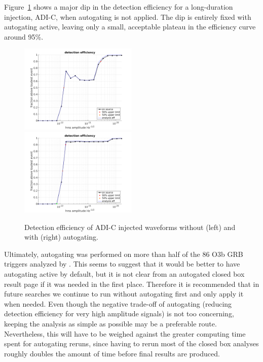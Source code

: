 Figure~\ref{fig:eff-before-after} shows a major dip in the detection efficiency for a long-duration injection, ADI-C, when autogating is not applied.
The dip is entirely fixed with autogating active, leaving only a small, acceptable plateau in the efficiency curve around 95\%.

\begin{figure}[htb]
	\includegraphics[trim={1.1cm 0 1.6cm 0}, clip, width=0.5\textwidth]{figures/grb/eff-before.png}
		\includegraphics[trim={1.1cm 0 1.6cm 0}, clip, width=0.5\textwidth]{figures/grb/eff-after.png}
	\caption{Detection efficiency of ADI-C injected waveforms without (left) and with (right) autogating.}
	\label{fig:eff-before-after}
\end{figure}



Ultimately, autogating was performed on more than half of the 86 O3b GRB triggers analyzed by \xpip.
This seems to suggest that it would be better to have autogating active by default, but it is not clear from an autogated closed box result page if it was needed in the first place.
Therefore it is recommended that in future searches we continue to run \xpip without autogating first and only apply it when needed.
Even though the negative trade-off of autogating (reducing detection efficiency for very high amplitude signals) is not too concerning, keeping the analysis as simple as possible may be a preferable route.
Nevertheless, this will have to be weighed against the greater computing time spent for autogating reruns, since having to rerun most of the closed box analyses roughly doubles the amount of time before final results are produced.


